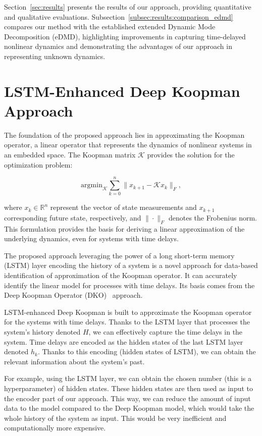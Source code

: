 \documentclass[conference]{IEEEtran}
\begin{document}
Section~\ref{sec:results} presents the results of our approach, providing quantitative and qualitative evaluations. Subsection~\ref{subsec:results:comparison_edmd} compares our method with the established extended Dynamic Mode Decomposition (eDMD), highlighting improvements in capturing time-delayed nonlinear dynamics and demonstrating the advantages of our approach in representing unknown dynamics.


\section{LSTM-Enhanced Deep Koopman Approach}\label{sec:methodology}

The foundation of the proposed approach lies in approximating the Koopman operator, a linear operator that represents the dynamics of nonlinear systems in an embedded space. The Koopman matrix \(\mathcal{K}\) provides the solution for the optimization problem:

\begin{equation}
    \mathrm{argmin}_{\mathcal{K}} \sum_{k=0}^{n} \| x_{k+1} - \mathcal{K}x_{k} \|_F,
\end{equation}

where \( x_{k} \in \mathbb{R}^n\) represent the vector of state measurements and \( x_{k+1} \) corresponding future state, respectively, and \( \|\cdot \| _F\) denotes the Frobenius norm. This formulation provides the basis for deriving a linear approximation of the underlying dynamics, even for systems with time delays.


The proposed approach leveraging the power of a long short-term memory (LSTM) layer encoding the history of a system is a novel approach for data-based identification of approximation of the Koopman operator. It can accurately identify the linear model for processes with time delays. Its basis comes from the Deep Koopman Operator (DKO)~\cite{lusch2018deep} approach.

LSTM-enhanced Deep Koopman is built to approximate the Koopman operator for the systems with time delays. Thanks to the LSTM layer that processes the system's history denoted \(H\), we can effectively capture the time delays in the system. Time delays are encoded as the hidden states of the last LSTM layer denoted \(h_k\). Thanks to this encoding (hidden states of LSTM), we can obtain the relevant information about the system's past.

For example, using the LSTM layer, we can obtain the chosen number (this is a hyperparameter) of hidden states. These hidden states are then used as input to the encoder part of our approach. This way, we can reduce the amount of input data to the model compared to the Deep Koopman model, which would take the whole history of the system as input. This would be very inefficient and computationally more expensive.
\end{document}
